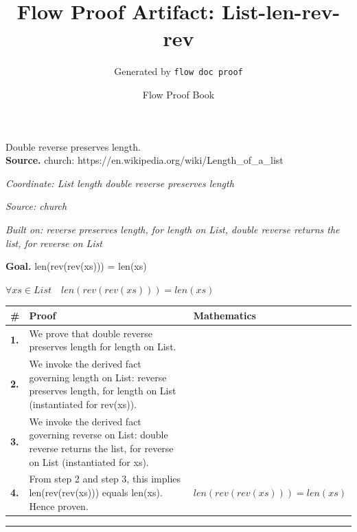 \documentclass[11pt]{article}
\title{Flow Proof Artifact: List-len-rev-rev}
\author{Generated by \texttt{flow doc proof}}
\date{Flow Proof Book}
\theoremstyle{definition}
\begin{document}
\maketitle
Double reverse preserves length.\\[0.5em]
\textbf{Source.} church: https://en.wikipedia.org/wiki/Length\_of\_a\_list\\[0.5em]
\bigskip
{}\par
\smallskip\noindent\textit{Coordinate: List \cdot length \cdot double reverse preserves length}\par
\smallskip\noindent\textit{Source: church}\par
\smallskip\noindent\textit{Built on: reverse preserves length, for length on List, double reverse returns the list, for reverse on List}\par
\medskip
\noindent\textbf{Goal.} len(rev(rev(xs))) = len(xs)\par
\noindent$\displaystyle \forall xs \in List\quad len(rev(rev(xs))) = len(xs)$\par
\medskip
\noindent
\begin{tabular}{@{} >{\raggedright\arraybackslash}p{} >{\raggedright\arraybackslash}p{} >{\raggedleft\arraybackslash}p{} @{}}
\textbf{\#} & \textbf{Proof} & \textbf{Mathematics} \\
\midrule
\textbf{1.} & We prove that double reverse preserves length for length on List. & \\[0.45em]
\textbf{2.} & We invoke the derived fact governing length on List: reverse preserves length, for length on List (instantiated for rev(xs)). & \\[0.45em]
\textbf{3.} & We invoke the derived fact governing reverse on List: double reverse returns the list, for reverse on List (instantiated for xs). & \\[0.45em]
\textbf{4.} & From step 2 and step 3, this implies len(rev(rev(xs))) equals len(xs). Hence proven. & $\displaystyle len(rev(rev(xs))) = len(xs)$ \\[0.45em]
\bottomrule
\end{tabular}
\label{thm:List-length-double_reverse_preserves_length}
\par\medskip\hrule
\end{document}
